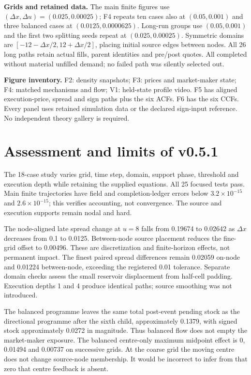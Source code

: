 \documentclass[11pt,a4paper]{article}
\newcommand{\du}{\Delta u}\newcommand{\dx}{\Delta x}
\begin{document}
\textbf{Grids and retained data.} The main finite figures use
$(\dx,\du)=(0.025,0.00025)$; F4 repeats ten cases also at $(0.05,0.001)$
and three balanced cases at $(0.0125,0.0000625)$.
Long-run groups use $(0.05,0.001)$ and the first two splitting seeds repeat
at $(0.025,0.00025)$. Symmetric domains are $[-12-\dx/2,12+\dx/2]$,
placing initial source edges between nodes. All 26 long paths retain
actual fills, parent identities and pre/post quotes. All completed without
material unfilled demand; no failed path was silently selected out.

\textbf{Figure inventory.} F2: density snapshots; F3: prices and market-maker
state; F4: matched mechanisms and flow; V1: held-state profile video.
F5 has aligned execution-price, spread and sign paths plus the six ACFs.
F6 has the six CCFs. Every panel uses retained simulation data or the
declared sign-input reference. No independent theory gallery is required.

\newpage
\section{Assessment and limits of v0.5.1}
The 18-case study varies grid, time step, domain, support phase, threshold
and execution depth while retaining the supplied equations. All 25 focused
tests pass. Main finite trajectories have field and completion-ledger errors
below $3.2\times10^{-15}$ and $2.6\times10^{-15}$; this verifies accounting,
not convergence. The source and execution supports remain nodal and hard.

The node-aligned late spread change at $u=8$ falls from 0.19674 to
0.02642 as $\dx$ decreases from 0.1 to 0.0125. Between-node source
placement reduces the fine-grid offset to 0.00496. These are discretization
and finite-horizon effects, not permanent impact. The finest paired spread
differences remain 0.02059 on-node and 0.01224 between-node, exceeding
the registered 0.01 tolerance. Separate domain checks assess the small
reservoir displacement from half-cell padding. Execution depths 1 and 4
produce identical paths; source smoothing was not introduced.

The balanced programme leaves the same total post-event pending stock as
the directional programme after the sixth child, approximately 0.1379,
with signed stock approximately 0.0272 in magnitude. Thus balanced flow
does not empty the market-maker exposure. The balanced centre-only maximum
midpoint effect is 0, 0.01494 and 0.00737 on successive grids. At the coarse
grid the moving centre does not change source-node membership. It would be
incorrect to infer from that zero that centre feedback is absent.
\end{document}
